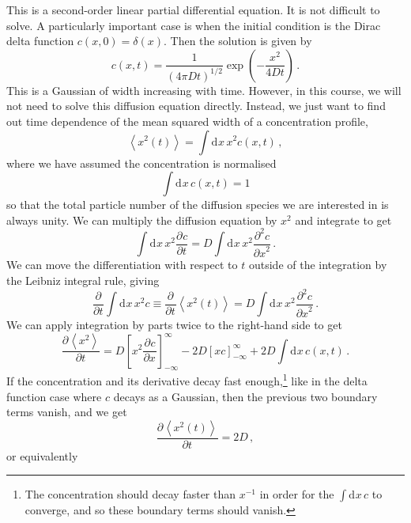 \documentclass{article}
\theoremstyle{plain}\theoremheaderfont{\normalfont\bfseries}\theorembodyfont{\rmfamily}\theoremseparator{.}\newtheorem*{thm}{Theorem}\newtheorem*{law}{Law}\newtheorem*{pos}{Postulate}
\numberwithin{equation}{section}
\newcommand{\dd}[2][]{\mathrm{d}^{#1} #2\,}
\newcommand{\pdv}[3][]{\frac{\partial^{#1} #2}{{\partial #3}^{#1}}}
\newcommand{\eval}[1]{\left\langle #1 \right\rangle}
\begin{document}
    This is a second-order linear partial differential equation. It is not difficult to solve. A particularly important case is when the initial condition is the Dirac delta function \(c(x,0)=\delta(x)\). Then the solution is given by
    \begin{equation}
        c(x,t)=\frac{1}{(4\pi Dt)^{1/2}}\exp\left(-\frac{x^2}{4Dt}\right)\,.
    \end{equation}
    This is a Gaussian of width increasing with time. However, in this course, we will not need to solve this diffusion equation directly. Instead, we just want to find out time dependence of the mean squared width of a concentration profile,
    \begin{equation}
        \eval{x^2(t)}=\int\dd{x}x^2c(x,t)\,,
    \end{equation}
    where we have assumed the concentration is normalised
    \begin{equation}
        \int\dd{x}c(x,t)=1
    \end{equation}
    so that the total particle number of the diffusion species we are interested in is always unity. We can multiply the diffusion equation by \(x^2\) and integrate to get
    \begin{equation}
        \int\dd{x}x^2\pdv{c}{t}=D\int\dd{x}x^2\pdv[2]{c}{x}\,.
    \end{equation}
    We can move the differentiation with respect to \(t\) outside of the integration by the Leibniz integral rule, giving
    \begin{equation}
        \pdv{}{t}\int\dd{x}x^2c\equiv\pdv{}{t}\eval{x^2(t)}=D\int\dd{x}x^2\pdv[2]{c}{x}\,.
    \end{equation}
    We can apply integration by parts twice to the right-hand side to get
    \begin{equation}
        \pdv{\eval{x^2}}{t}=D\left[x^2\pdv{c}{x}\right]_{-\infty}^{\infty}-2D\left[xc\right]_{-\infty}^{\infty}+2D\int\dd{x}c(x,t)\,.
    \end{equation}
    If the concentration and its derivative decay fast enough,\footnote{The concentration should decay faster than \(x^{-1}\) in order for the \(\int\dd{x}c\) to converge, and so these boundary terms should vanish.} like in the delta function case where \(c\) decays as a Gaussian, then the previous two boundary terms vanish, and we get
    \begin{equation}\label{Einstein_relation}
        \pdv{\eval{x^2(t)}}{t}=2D\,,
    \end{equation}
    or equivalently
\end{document}
